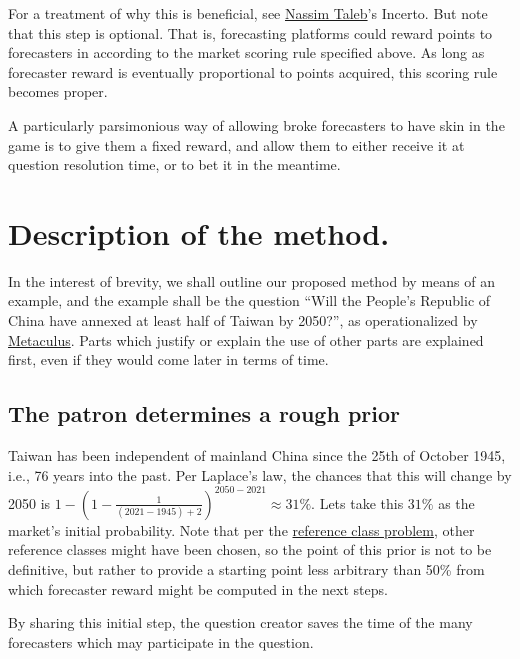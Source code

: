 \documentclass[]{article}
\begin{document}
For a treatment of why this is beneficial, see
\href{https://twitter.com/nntaleb}{Nassim Taleb}'s Incerto. But note
that this step is optional. That is, forecasting platforms could reward
points to forecasters in according to the market scoring rule specified
above. As long as forecaster reward is eventually proportional to points
acquired, this scoring rule becomes proper.

A particularly parsimonious way of allowing broke forecasters to have
skin in the game is to give them a fixed reward, and allow them to
either receive it at question resolution time, or to bet it in the
meantime.

\hypertarget{description-of-the-method.}{%
\section{Description of the method.}\label{description-of-the-method.}}

In the interest of brevity, we shall outline our proposed method by
means of an example, and the example shall be the question ``Will the
People's Republic of China have annexed at least half of Taiwan by
2050?'', as operationalized by
\href{https://www.metaculus.com/questions/5320/chinese-annexation-of-most-of-taiwan-by-2050/}{Metaculus}.
Parts which justify or explain the use of other parts are explained
first, even if they would come later in terms of time.

\hypertarget{the-patron-determines-a-rough-prior}{%
\subsection{The patron determines a rough
prior}\label{the-patron-determines-a-rough-prior}}

Taiwan has been independent of mainland China since the 25th of October
1945, i.e., 76 years into the past. Per Laplace's law, the chances that
this will change by 2050 is
\(1-(1-\frac{1}{(2021-1945)+2})^{2050-2021} \approx 31\%\). Lets take
this \(31\%\) as the market's initial probability. Note that per the
\href{https://en.wikipedia.org/wiki/Reference_class_problem}{reference
class problem}, other reference classes might have been chosen, so the
point of this prior is not to be definitive, but rather to provide a
starting point less arbitrary than 50\% from which forecaster reward
might be computed in the next steps.

By sharing this initial step, the question creator saves the time of the
many forecasters which may participate in the question.
\end{document}
